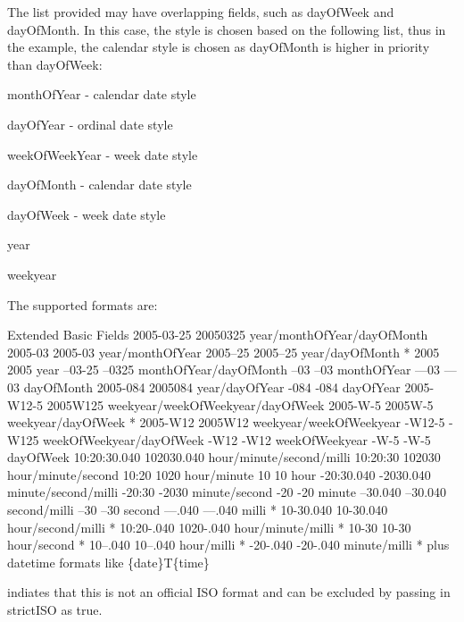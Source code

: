 The list provided may have overlapping fields, such as day\-Of\-Week and day\-Of\-Month. In this case, the style is chosen based on the following list, thus in the example, the calendar style is chosen as day\-Of\-Month is higher in priority than day\-Of\-Week\-: 
\begin{DoxyItemize}
\item month\-Of\-Year -\/ calendar date style 
\item day\-Of\-Year -\/ ordinal date style 
\item week\-Of\-Week\-Year -\/ week date style 
\item day\-Of\-Month -\/ calendar date style 
\item day\-Of\-Week -\/ week date style 
\item year 
\item weekyear 
\end{DoxyItemize}The supported formats are\-: 
\begin{DoxyPre}
Extended      Basic       Fields
2005-03-25    20050325    year/monthOfYear/dayOfMonth
2005-03       2005-03     year/monthOfYear
2005--25      2005--25    year/dayOfMonth *
2005          2005        year
--03-25       --0325      monthOfYear/dayOfMonth
--03          --03        monthOfYear
---03         ---03       dayOfMonth
2005-084      2005084     year/dayOfYear
-084          -084        dayOfYear
2005-W12-5    2005W125    weekyear/weekOfWeekyear/dayOfWeek
2005-W-5      2005W-5     weekyear/dayOfWeek *
2005-W12      2005W12     weekyear/weekOfWeekyear
-W12-5        -W125       weekOfWeekyear/dayOfWeek
-W12          -W12        weekOfWeekyear
-W-5          -W-5        dayOfWeek
10:20:30.040  102030.040  hour/minute/second/milli
10:20:30      102030      hour/minute/second
10:20         1020        hour/minute
10            10          hour
-20:30.040    -2030.040   minute/second/milli
-20:30        -2030       minute/second
-20           -20         minute
--30.040      --30.040    second/milli
--30          --30        second
---.040       ---.040     milli *
10-30.040     10-30.040   hour/second/milli *
10:20-.040    1020-.040   hour/minute/milli *
10-30         10-30       hour/second *
10--.040      10--.040    hour/milli *
-20-.040      -20-.040    minute/milli *
  plus datetime formats like \{date\}T\{time\}
\end{DoxyPre}

\begin{DoxyItemize}
\item indiates that this is not an official I\-S\-O format and can be excluded by passing in {\ttfamily strict\-I\-S\-O} as {\ttfamily true}. 
\end{DoxyItemize}

